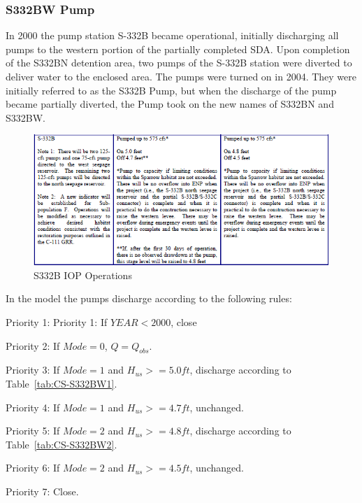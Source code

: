 \clearpage
\subsubsection{S332BW Pump}
In 2000 the pump station S-332B became operational, initially discharging all pumps to the western portion of the partially completed SDA.
Upon completion of the S332BN detention area, two pumps of the S-332B station were diverted to deliver water to the enclosed area.
The pumps were turned on in 2004. They were initially referred to as the S332B Pump, but when the discharge of the pump became partially diverted, the Pump took on the new names of S332BN and S332BW.

\begin{figure}[!h]
  \begin{center}
  \includegraphics[width=6.5in]{../figs/S332B_IOPops.png}
  \caption{S332B IOP Operations}
  \label{fig:S332BWiop}
  \end{center}
\end{figure}


In the model the pumps discharge according to the following rules:

\begin{packed_items}
\item Priority 1: Priority 1: If $YEAR < 2000$, close
\item[]
\item Priority 2: If $Mode=0$, $Q = Q_{obs}$.
\item[]
\item Priority 3: If $Mode=1$ and $H_{us}>=5.0 ft$, discharge according to Table~\ref{tab:CS-S332BW1}.
\item Priority 4: If $Mode=1$ and $H_{us}>=4.7 ft$, unchanged.
\item[]
\item Priority 5: If $Mode=2$ and $H_{us}>=4.8 ft$,  discharge according to Table~\ref{tab:CS-S332BW2}.
\item Priority 6: If $Mode=2$ and $H_{us}>=4.5 ft$,  unchanged.
\item[]
\item Priority 7: Close.
\end{packed_items}


